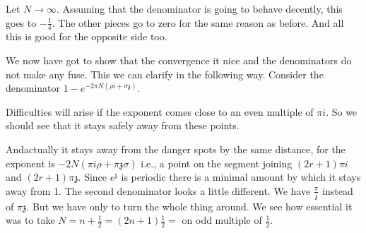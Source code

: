Let $N \to \infty$. Assuming that the denominator is going to behave
decently, this goes to $- \frac{1}{4}$. The other pieces go to zero
for the same reason as before. And all this is good for the opposite
side too.

We now have got to show that the convergence it nice and the
denominators do not make any fuse. This we can clarify in the
following way. Consider the denominator $1- e^{- 2 \pi N (\rho i +
  \sigma \mathfrak{z})}$. 

Difficulties will arise if the exponent comes close to an even
multiple of $\pi i$. So we should see that it stays safely away from
these points. 

\begin{figure}[H]
\end{figure}

And\pageoriginale actually it stays away from the danger spots by the same distance,
for the exponent is $- 2N (\pi i \rho + \pi \mathfrak{z} \sigma)$
i.e., a point on the segment joining $( 2r+1)\pi i$ and $(2 r +1) \pi
\mathfrak{z}$. Since $e^{\mathfrak{z}}$ is periodic there is a minimal
amount by which it stays away from 1. The second denominator looks a
little different. We have $\frac{\pi}{\mathfrak{z}}$ instead of $\pi
\mathfrak{z}$. But we have only to turn the whole thing around. We see
how essential it was to take $N= n + \frac{1}{2} = (2n+1)\frac{1}{2}=
$ on odd multiple of $\frac{1}{2}$. 


